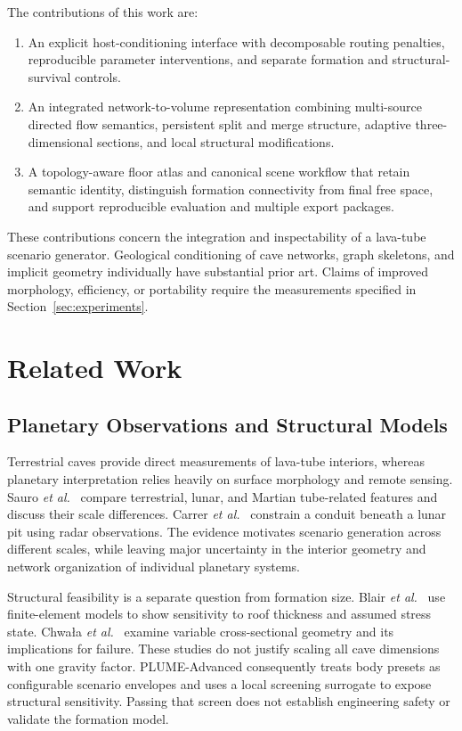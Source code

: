 \documentclass[conference]{IEEEtran}
\begin{document}
The contributions of this work are:
\begin{enumerate}
\item An explicit host-conditioning interface with decomposable routing penalties, reproducible parameter interventions, and separate formation and structural-survival controls.
\item An integrated network-to-volume representation combining multi-source directed flow semantics, persistent split and merge structure, adaptive three-dimensional sections, and local structural modifications.
\item A topology-aware floor atlas and canonical scene workflow that retain semantic identity, distinguish formation connectivity from final free space, and support reproducible evaluation and multiple export packages.
\end{enumerate}
These contributions concern the integration and inspectability of a lava-tube scenario generator. Geological conditioning of cave networks, graph skeletons, and implicit geometry individually have substantial prior art. Claims of improved morphology, efficiency, or portability require the measurements specified in Section~\ref{sec:experiments}.

\section{Related Work}
\subsection{Planetary Observations and Structural Models}
Terrestrial caves provide direct measurements of lava-tube interiors, whereas planetary interpretation relies heavily on surface morphology and remote sensing. Sauro \emph{et al.}\ \cite{sauro2020} compare terrestrial, lunar, and Martian tube-related features and discuss their scale differences. Carrer \emph{et al.}\ \cite{carrer2024} constrain a conduit beneath a lunar pit using radar observations. The evidence motivates scenario generation across different scales, while leaving major uncertainty in the interior geometry and network organization of individual planetary systems.

Structural feasibility is a separate question from formation size. Blair \emph{et al.}\ \cite{blair2017} use finite-element models to show sensitivity to roof thickness and assumed stress state. Chwa\l{}a \emph{et al.}\ \cite{chwala2024} examine variable cross-sectional geometry and its implications for failure. These studies do not justify scaling all cave dimensions with one gravity factor. PLUME-Advanced consequently treats body presets as configurable scenario envelopes and uses a local screening surrogate to expose structural sensitivity. Passing that screen does not establish engineering safety or validate the formation model.
\end{document}
